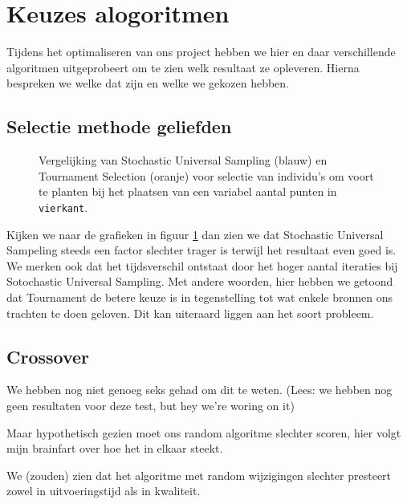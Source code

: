 %
\section{Keuzes alogoritmen}
Tijdens het optimaliseren van ons project hebben we hier en daar verschillende algoritmen uitgeprobeert om te zien welk resultaat ze opleveren. Hierna bespreken we welke dat zijn en welke we gekozen hebben.
\subsection{Selectie methode geliefden}
\label{sub:algLoverSelection}


\begin{figure}[H]
\caption{Vergelijking van Stochastic Universal Sampling (blauw) en Tournament Selection (oranje) voor selectie van individu's om voort te planten bij het plaatsen van een variabel aantal punten in \texttt{vierkant}.}
\label{graf:algLoverSelection}
\end{figure}
Kijken we naar de grafieken in figuur \ref{graf:algLoverSelection} dan zien we dat Stochastic Universal Sampeling steeds een factor slechter trager is terwijl het resultaat even goed is. We merken ook dat het tijdsverschil ontstaat door het hoger aantal iteraties bij Sotochastic Universal Sampling. Met andere woorden, hier hebben we getoond dat Tournament de betere keuze is in tegenstelling tot wat enkele bronnen ons trachten te doen geloven. Dit kan uiteraard liggen aan het soort probleem.


\subsection{Crossover}
\label{ssub:crossover_type}
We hebben nog niet genoeg seks gehad om dit te weten. (Lees: we hebben nog geen resultaten voor deze test, but hey we're woring on it)

Maar hypothetisch gezien moet ons random algoritme slechter scoren, hier volgt mijn brainfart over hoe het in elkaar steekt.

We (zouden) zien dat het algoritme met random wijzigingen slechter presteert zowel in uitvoeringstijd als in kwaliteit.

